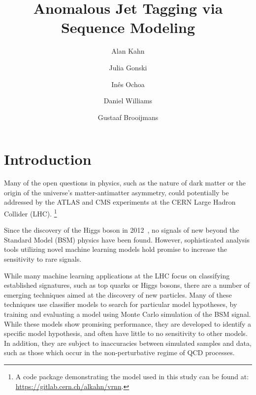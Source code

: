 \documentclass[11pt, a4paper]{article}
\title{Anomalous Jet Tagging via Sequence Modeling}
\author[a]{Alan Kahn}
\author[a]{Julia Gonski}
\author[b]{In\^{e}s Ochoa}
\author[a]{Daniel Williams}
\author[a]{Gustaaf Brooijmans}
\affiliation[a]{Nevis Laboratories, Columbia University, \\Irvington, USA}
\affiliation[b]{Laboratory of Instrumentation and Experimental Particle Physics, \\Lisbon, Portugal}
\newcommand\blfootnote[1]{%
  \begingroup
  \renewcommand\thefootnote{}\footnote{#1}%
  \addtocounter{footnote}{-1}%
  \endgroup
}
\begin{document}
 



\baselineskip16pt

\maketitle 

\setlength{\abovedisplayskip}{5pt}
\setlength{\belowdisplayskip}{5pt}
\setlength{\abovedisplayshortskip}{0pt}
\setlength{\belowdisplayshortskip}{0pt}


\clearpage


\clearpage







\section{Introduction}



Many of the open questions in physics, such as the nature of dark matter or the origin of the universe's matter-antimatter asymmetry, could potentially be addressed by the ATLAS and CMS experiments at the CERN Large Hadron Collider (LHC).\blfootnote{A code package demonstrating the model used in this study can be found at: \url{https://gitlab.cern.ch/alkahn/vrnn}.}
Since the discovery of the Higgs boson in 2012~\cite{atlas_higgs,cms_higgs}, no signals of new beyond the Standard Model (BSM) physics have been found. 
However, sophisticated analysis tools utilizing novel machine learning models hold promise to increase the sensitivity to rare signals. 
 
While many machine learning applications at the LHC focus on classifying established signatures, such as top quarks or Higgs bosons, there are a number of emerging techniques aimed at the discovery of new particles. 
Many of these techniques use classifier models to search for particular model hypotheses, by training and evaluating a model using Monte Carlo simulation of the BSM signal.
While these models show promising performance, they are developed to identify a specific model hypothesis, and often have little to no sensitivity to other models. In addition, they are subject to inaccuracies between simulated samples and data, such as those which occur in the non-perturbative regime of QCD processes.
\end{document}
